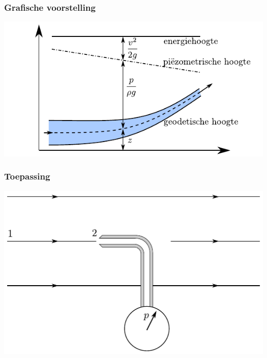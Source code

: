 \documentclass[t]{beamer}
\begin{document}
	\begin{frame}
		\frametitle{Grafische voorstelling}
		\vspace{1cm}
		\center
		\includegraphics{../fig/deeltjesvergelijkingen/Energiehoogte}
	\end{frame}
	\begin{frame}
		\frametitle{Toepassing}
		\vspace{1cm}
		\center
		\includegraphics{../fig/deeltjesvergelijkingen/Pitotbuis}
	\end{frame}
\end{document}
